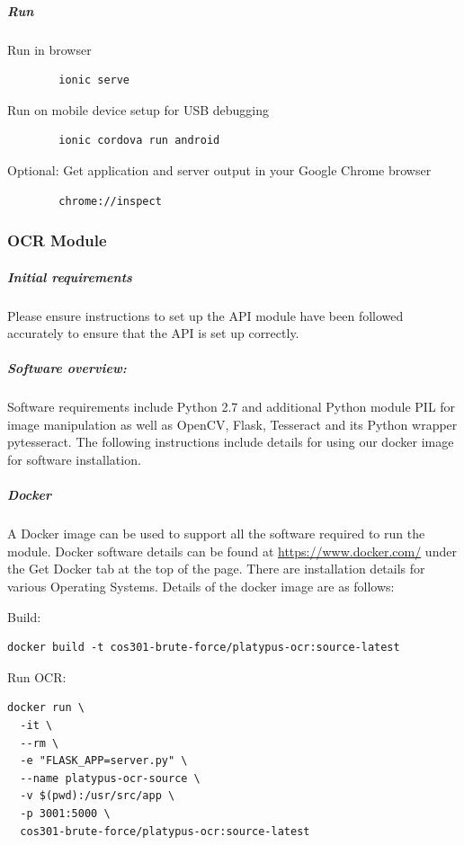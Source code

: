 \documentclass[12pt,a4paper]{article}
\begin{document}
\subparagraph{Run}
\subparagraph{}
Run in browser
\begin{lstlisting}
		ionic serve
	\end{lstlisting}
   \vspace{1cm}
Run on mobile device setup for USB debugging
\begin{lstlisting}
		ionic cordova run android
	\end{lstlisting}
   \vspace{1cm}
Optional: Get application and server output in your Google Chrome browser
	\begin{lstlisting}
		chrome://inspect
	\end{lstlisting}

    \subsubsection{OCR Module}
       \subparagraph{Initial requirements}
Please ensure instructions to set up the API module have been followed accurately to ensure that the API is set up correctly.
    \subparagraph{Software overview:}
    \subparagraph{}
    
Software requirements include Python 2.7 and additional Python module PIL for image manipulation as well as OpenCV, Flask, Tesseract and its Python wrapper pytesseract. The following instructions include details for using our docker image for software installation.

\subparagraph{Docker}
\subparagraph{}
A Docker image can be used to support all the software required to run the module. Docker software details can be found at \url{https://www.docker.com/} under the Get Docker tab at the top of the page. There are installation details for various Operating Systems. Details of the docker image are as follows: 

Build:  
\vspace{0.5cm}
\begin{lstlisting}
docker build -t cos301-brute-force/platypus-ocr:source-latest
\end{lstlisting}
\vspace{0.5cm}

Run OCR:
\vspace{0.5cm}
\begin{lstlisting}
docker run \
  -it \
  --rm \
  -e "FLASK_APP=server.py" \
  --name platypus-ocr-source \
  -v $(pwd):/usr/src/app \
  -p 3001:5000 \
  cos301-brute-force/platypus-ocr:source-latest

\end{lstlisting}
\end{document}
